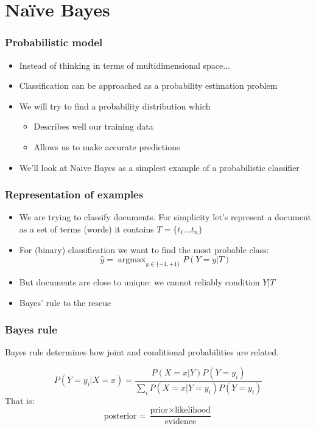\documentclass[14pt,mathserif]{beamer}
\DeclareMathOperator*{\argmax}{argmax}
\begin{document}
\section{Na{\"i}ve Bayes}
\begin{frame}
  \frametitle{Probabilistic model}
  \begin{itemize}
  \item Instead of thinking in terms of multidimensional space...
  \item Classification can be approached as a probability estimation problem
  \item We will try to find a probability distribution which
    \begin{itemize}
    \item  Describes
    well our training data 
  \item Allows us  to make accurate predictions 
    \end{itemize}
  \item We'll look at Naive Bayes as a simplest example of a
    probabilistic classifier
  \end{itemize}
\end{frame}


\begin{frame}
  \frametitle{Representation of examples}
  \begin{itemize}
    \item We are trying to classify documents. For simplicity let's
    represent a document as a set of terms (words) it contains $T =
    \{t_1...t_n\}$
  \item For (binary) classification we want to find the most probable class:
    \[ \hat{y} = \argmax_{y \in \{-1,+1\}} P(Y=y|T) \]
  \item But documents are close to unique: we cannot reliably
    condition $Y|T$
  \item Bayes' rule to the rescue
  \end{itemize}
\end{frame}


\begin{frame}
  \frametitle{Bayes rule} Bayes rule determines how joint and
  conditional probabilities are related.
 
  \begin{block}{}
\[
P(Y=y_i|X=x) = \frac{P(X=x|Y) P(Y=y_i)}{\sum_i P(X=x|Y=y_i)
  P(Y=y_i)}
\]
That is:
\[
\mbox{posterior} = \frac{\mbox{prior} \times
  \mbox{likelihood}}{\mbox{evidence}}
\]
\end{block}
\end{frame}
\end{document}
